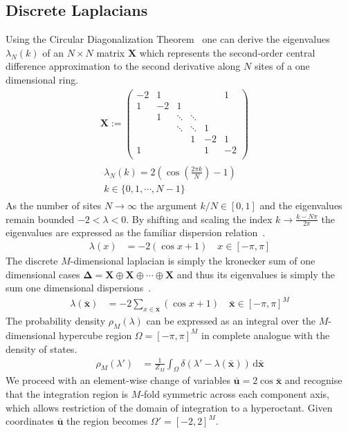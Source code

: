 \documentclass{article}[12pt]
\numberwithin{equation}{section}
\begin{document}
\subsection{Discrete Laplacians}
Using the Circular Diagonalization Theorem~\cite{} one can derive the
eigenvalues $\lambda_N(k)$ of an $N\times N$ matrix $\mathbf X$ which
represents the second-order central difference approximation to the
second derivative along $N$ sites of a one dimensional ring.
\begin{align}
  \mathbf X :=
  \begin{pmatrix}
    -2 & 1 &  &  &  & 1 \\
    1 & -2 & 1 &  &  &  \\
    & 1 & \ddots & \ddots &  & \\
    & & \ddots & \ddots & 1 & \\
    & & & 1 & -2 & 1 \\
    1 & & & & 1 & -2 \\
  \end{pmatrix}\\
  \begin{matrix}
    \lambda_N(k)=2\left(\cos\left(\frac{2\pi k}{N}\right)-1\right) \\
    k\in\{0,1,\cdots,N-1\}
  \end{matrix}
  \qquad
\end{align}
As the number of sites $N\rightarrow\infty$ the argument $k/N\in[0,1]$
and the eigenvalues remain bounded $-2<\lambda<0$. By shifting and scaling
the index $k\rightarrow\frac{k-N\pi}{2\pi}$ the eigenvalues are expressed as
the familiar dispersion relation~\cite{}.
\begin{align}
  \lambda(x)&=
  -2\left(\cos x+1\right)
  \quad x\in[-\pi,\pi]
\end{align}
The discrete $M$-dimensional laplacian is simply the kronecker sum of one
dimensional cases $\mathbf\Delta=\mathbf X\oplus\mathbf X\oplus\cdots\oplus\mathbf X$
and thus its eigenvalues is simply the sum one dimensional dispersions~\cite{}.
\begin{align}
  \lambda(\bar{\mathbf{x}})&=
  -2\sum_{x\in\bar{\mathbf{x}}}\left(\cos x+1\right)
  \quad \bar{\mathbf{x}}\in[-\pi,\pi]^M
\end{align}
The probability density $\rho_M(\lambda)$ can be expressed as an integral
over the $M$-dimensional hypercube region $\Omega=[-\pi,\pi]^M$ in complete
analogue with the density of states.
\begin{align*}
  \rho_M(\lambda')&=\frac{1}{Z_M}\int_{\Omega}\!\delta(\lambda'-\lambda(\bar{\mathbf{x}}))\,\mathrm{d}\bar{\mathbf{x}}
\end{align*}
We proceed with an element-wise change of variables $\bar{\mathbf{u}}=2\cos \bar{\mathbf{x}}$ and
recognise that the integration region is $M$-fold symmetric across each
component axis, which allows restriction of the domain of integration to a
hyperoctant. Given coordinates $\bar{\mathbf{u}}$ the region becomes $\Omega'=[-2,2]^M$.
\end{document}
